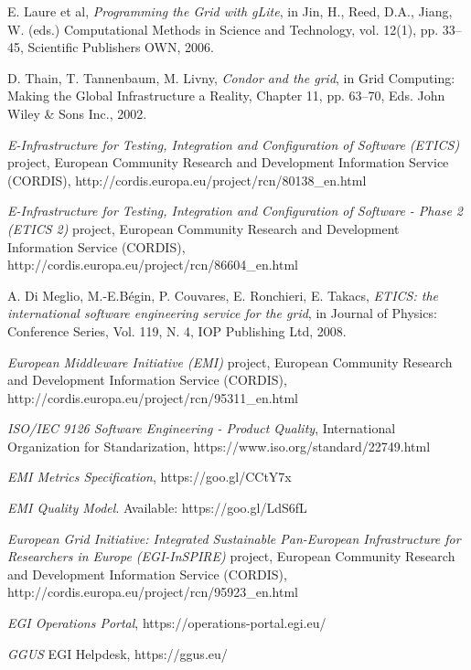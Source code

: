\documentclass[journal]{IEEEtran}
\begin{document}
\begin{thebibliography}{1}
E. Laure et al, \emph{Programming the Grid with gLite}, in Jin, H., Reed, D.A.,
Jiang, W. (eds.) Computational Methods in Science and Technology, vol. 12(1),
pp. 33–45, Scientific Publishers OWN, 2006.

D. Thain, T. Tannenbaum, M. Livny, \emph{Condor and the grid}, in Grid
Computing: Making the Global Infrastructure a Reality, Chapter 11, pp. 63–70,
Eds. John Wiley \& Sons Inc., 2002.

\emph{E-Infrastructure for Testing, Integration and Configuration of Software
(ETICS)} project, European Community Research and Development Information
Service (CORDIS), http://cordis.europa.eu/project/rcn/80138\_en.html

\emph{E-Infrastructure for Testing, Integration and Configuration of Software -
Phase 2 (ETICS 2)} project, European Community Research and Development
Information Service (CORDIS),
http://cordis.europa.eu/project/rcn/86604\_en.html

A. Di Meglio, M.-E.Bégin, P. Couvares, E. Ronchieri, E. Takacs, \emph{ETICS:
the international software engineering service for the grid}, in Journal of
Physics: Conference Series, Vol. 119, N. 4, IOP Publishing Ltd, 2008.

\emph{European Middleware Initiative (EMI)} project, European Community
Research and Development Information Service (CORDIS),
http://cordis.europa.eu/project/rcn/95311\_en.html

\emph{ISO/IEC 9126 Software Engineering - Product Quality}, International
Organization for Standarization, https://www.iso.org/standard/22749.html

\emph{EMI Metrics Specification}, https://goo.gl/CCtY7x


\emph{EMI Quality Model}. Available: https://goo.gl/LdS6fL

\emph{European Grid Initiative: Integrated Sustainable Pan-European
Infrastructure for Researchers in Europe (EGI-InSPIRE)} project, European
Community Research and Development Information Service (CORDIS),
http://cordis.europa.eu/project/rcn/95923\_en.html

\emph{EGI Operations Portal},
https://operations-portal.egi.eu/

\emph{GGUS} EGI Helpdesk,
https://ggus.eu/


\end{thebibliography}
\end{document}
